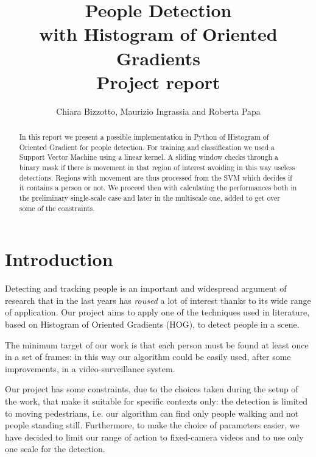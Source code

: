 \documentclass[a4paper, 11pt, onecolumn]{article} %
\begin{document}
\title{People Detection \\with Histogram of Oriented Gradients \\
\large Project report}
\author{Chiara Bizzotto, Maurizio Ingrassia and Roberta Papa}

\maketitle

\begin{abstract}
In this report we present a possible implementation in Python of Histogram of Oriented Gradient for people detection. For training and classification we used a Support Vector Machine using a linear kernel. A sliding window checks through a binary mask if there is movement in that region of interest avoiding in this way useless detections. Regions with movement are thus processed from the SVM which decides if it contains a person or not.
We proceed then with calculating the performances both in the preliminary single-scale case and later in the multiscale one, added to get over some of the constraints. 
\end{abstract}

\section{Introduction}
Detecting and tracking people is an important and widespread argument of research that in the last years has \emph{roused} a lot of interest thanks to its wide range of application. Our project aims to apply one of the techniques used in literature, based on Histogram of Oriented Gradients (HOG), to detect people in a scene. 

The minimum target of our work is that each person must be found at least once in a set of frames: in this way our algorithm could be easily used, after some improvements, in a video-surveillance system.

Our project has some constraints, due to the choices taken during the setup of the work, that make it suitable for specific contexts only: the detection is limited to moving pedestrians, i.e. our algorithm can find only people walking and not people standing still. Furthermore, to make the choice of parameters easier, we have decided to limit our range of action to fixed-camera videos and to use only one scale for the detection.
\end{document}
